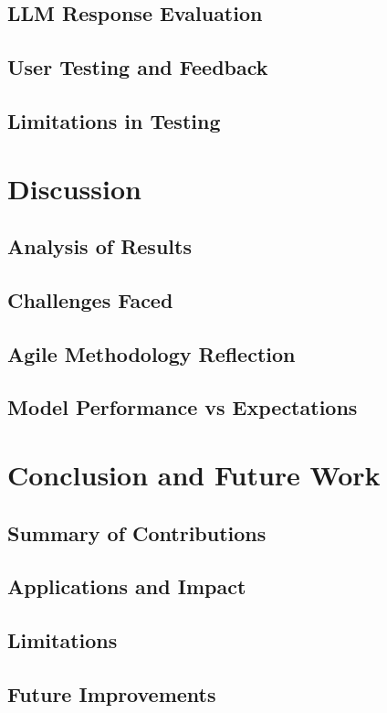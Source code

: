 \documentclass{report}
\begin{document}
\section{LLM Response Evaluation}
\section{User Testing and Feedback}
\section{Limitations in Testing}

\chapter{Discussion}  %
\section{Analysis of Results}
\section{Challenges Faced}
\section{Agile Methodology Reflection}
\section{Model Performance vs Expectations}

\chapter{Conclusion and Future Work}  %
\section{Summary of Contributions}
\section{Applications and Impact}
\section{Limitations}
\section{Future Improvements}
\end{document}
